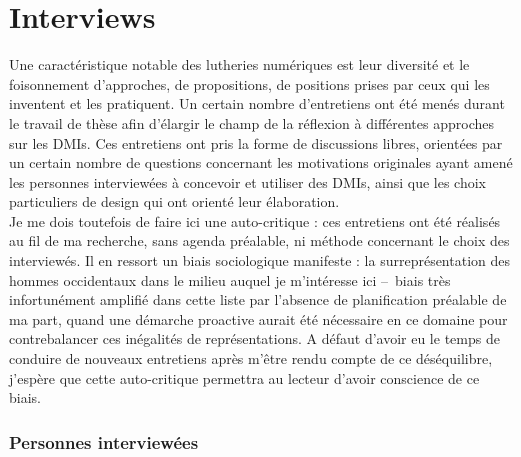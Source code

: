 
\section{Interviews}

\noindent Une caractéristique notable des lutheries numériques est leur diversité et le foisonnement d'approches, de propositions, de positions prises par ceux qui les inventent et les pratiquent. Un certain nombre d'entretiens ont été menés durant le travail de thèse afin d'élargir le champ de la réflexion à différentes approches sur les \glspl{DMI}. Ces entretiens ont pris la forme de discussions libres, orientées par un certain nombre de questions concernant les motivations originales ayant amené les personnes interviewées à concevoir et utiliser des \glspl{DMI}, ainsi que les choix particuliers de design qui ont orienté leur élaboration.\\ 
\indent Je me dois toutefois de faire ici une auto-critique : ces entretiens ont été réalisés au fil de ma recherche, sans agenda préalable, ni méthode concernant le choix des interviewés. Il en ressort un biais sociologique manifeste : la surreprésentation des hommes occidentaux dans le milieu auquel je m'intéresse ici --~biais très infortunément amplifié dans cette liste par l'absence de planification préalable de ma part, quand une démarche proactive aurait été nécessaire en ce domaine pour contrebalancer ces inégalités de représentations. A défaut d'avoir eu le temps de conduire de nouveaux entretiens après m'être rendu compte de ce déséquilibre, j'espère que cette auto-critique permettra au lecteur d'avoir conscience de ce biais.

\subsubsection*{Personnes interviewées}

